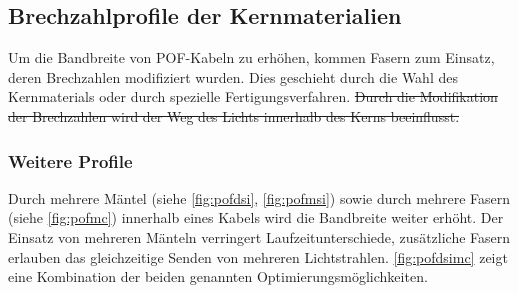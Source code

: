 \subsection{Brechzahlprofile der Kernmaterialien}
\label{subsec:pofbrechzahlprofile}

Um die Bandbreite von POF-Kabeln zu erhöhen, kommen Fasern zum Einsatz, deren
Brechzahlen modifiziert wurden. Dies geschieht durch die Wahl des Kernmaterials
oder durch spezielle Fertigungsverfahren. \sout{Durch die Modifikation der
Brechzahlen wird der Weg des Lichts innerhalb des Kerns beeinflusst.}




\subsubsection{Weitere Profile}

Durch mehrere Mäntel (siehe \autoref{fig:pofdsi}, \autoref{fig:pofmsi}) sowie
durch mehrere Fasern (siehe \autoref{fig:pofmc}) innerhalb eines Kabels wird die
Bandbreite weiter erhöht. Der Einsatz von mehreren Mänteln verringert
Laufzeitunterschiede, zusätzliche Fasern erlauben das gleichzeitige Senden von
mehreren Lichtstrahlen. \autoref{fig:pofdsimc} zeigt eine Kombination der beiden
genannten Optimierungsmöglichkeiten. \cite{pofacprofile}

